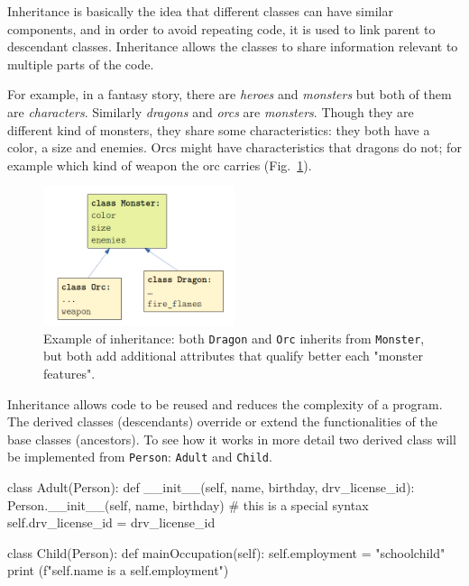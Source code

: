 Inheritance is basically the idea that different classes can have similar components, and in order to avoid repeating code, it is used to link parent to descendant classes. Inheritance allows the classes to share information relevant to multiple parts of the code.

For example, in a fantasy story, there are \emph{heroes} and \emph{monsters} but both of them are \emph{characters}. Similarly \emph{dragons} and \emph{orcs} are \emph{monsters}. Though they are different kind of monsters, they share some characteristics: they both have a color, a size and enemies. Orcs might have characteristics that dragons do not; for example which kind of weapon the orc carries (Fig.~\ref{fig:inheritance}). 

\begin{figure}[h]
  \centering
  \includegraphics[width=0.5\textwidth]{figures/inheritance.png}
  \caption{Example of inheritance: both \texttt{Dragon} and \texttt{Orc} inherits from \texttt{Monster}, but both add additional attributes that qualify better each "monster features".}
  \label{fig:inheritance}
\end{figure}

Inheritance allows code to be reused and reduces the complexity of a program. The derived classes (descendants) override or extend the functionalities of the base classes (ancestors). To see how it works in more detail two derived class will be implemented from \texttt{Person}: \texttt{Adult} and \texttt{Child}.

\begin{ipython}
class Adult(Person):
    def __init__(self, name, birthday, drv_license_id):
        Person.__init__(self, name, birthday) # this is a special syntax
        self.drv_license_id = drv_license_id

class Child(Person):
    def mainOccupation(self):
        self.employment = "schoolchild"
        print (f"{self.name} is a {self.employment}")
\end{ipython}


